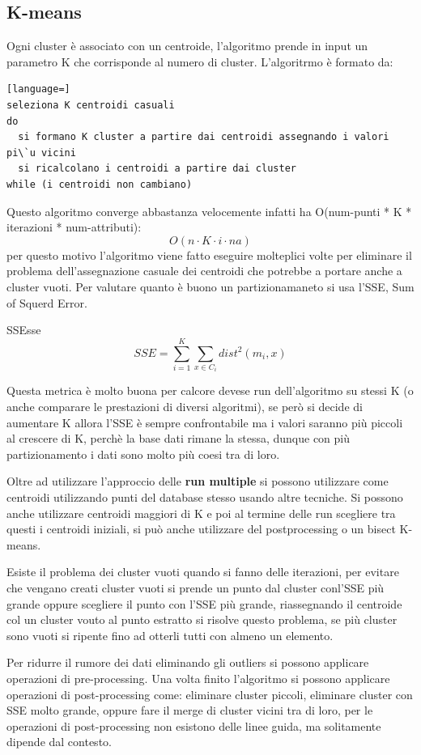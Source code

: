 \documentclass[12pt]{article}
\begin{document}
\subsection{K-means}
Ogni cluster \`e associato con un centroide, l'algoritmo prende in input un parametro K che corrisponde al numero di cluster. L'algoritrmo \`e formato da:
\begin{lstlisting}[language=]
seleziona K centroidi casuali
do
  si formano K cluster a partire dai centroidi assegnando i valori pi\`u vicini
  si ricalcolano i centroidi a partire dai cluster
while (i centroidi non cambiano)
\end{lstlisting}
Questo algoritmo converge abbastanza velocemente infatti ha O(num-punti * K * iterazioni * num-attributi):
\[ O(n \cdot K \cdot i \cdot na) \]
per questo motivo l'algoritmo viene fatto eseguire molteplici volte per eliminare il problema dell'assegnazione casuale dei centroidi che potrebbe a portare anche a cluster vuoti. Per valutare quanto \`e buono un partizionamaneto si usa l'SSE, Sum of Squerd Error.
\begin{definition}{SSE}{sse}
    \[ SSE = \sum_{i=1}^{K} \sum_{x \in C_i}^{} dist^{2}(m_i, x) \]
\end{definition}
Questa metrica \`e molto buona per calcore devese run dell'algoritmo su stessi K (o anche comparare le prestazioni di diversi algoritmi), se per\`o si decide di aumentare K allora l'SSE \`e sempre confrontabile ma i valori saranno pi\`u piccoli al crescere di K, perch\`e la base dati rimane la stessa, dunque con pi\`u partizionamento i dati sono molto pi\`u coesi tra di loro.

Oltre ad utilizzare l'approccio delle \textbf{run multiple} si possono utilizzare come centroidi utilizzando punti del database stesso usando altre tecniche. Si possono anche utilizzare centroidi maggiori di K e poi al termine delle run scegliere tra questi i centroidi iniziali, si pu\`o anche utilizzare del postprocessing o un bisect K-means.

Esiste il problema dei cluster vuoti quando si fanno delle iterazioni, per evitare che vengano creati cluster vuoti si prende un punto dal cluster conl'SSE pi\`u grande oppure scegliere il punto con l'SSE pi\`u grande, riassegnando il centroide col un cluster vouto al punto estratto si risolve questo problema, se pi\`u cluster sono vuoti si ripente fino ad otterli tutti con almeno un elemento.

Per ridurre il rumore dei dati eliminando gli outliers si possono applicare operazioni di pre-processing. Una volta finito l'algoritmo si possono applicare operazioni di post-processing come: eliminare cluster piccoli, eliminare cluster con SSE molto grande, oppure fare il merge di cluster vicini tra di loro, per le operazioni di post-processing non esistono delle linee guida, ma solitamente dipende dal contesto.
\end{document}
